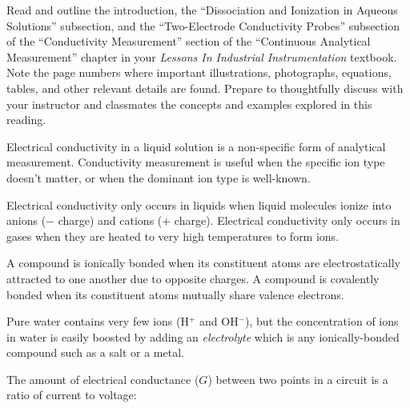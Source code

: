 
Read and outline the introduction, the ``Dissociation and Ionization in Aqueous Solutions'' subsection, and the ``Two-Electrode Conductivity Probes'' subsection of the ``Conductivity Measurement'' section of the ``Continuous Analytical Measurement'' chapter in your {\it Lessons In Industrial Instrumentation} textbook.  Note the page numbers where important illustrations, photographs, equations, tables, and other relevant details are found.  Prepare to thoughtfully discuss with your instructor and classmates the concepts and examples explored in this reading.













Electrical conductivity in a liquid solution is a non-specific form of analytical measurement.  Conductivity measurement is useful when the specific ion type doesn't matter, or when the dominant ion type is well-known.

\vskip 10pt

Electrical conductivity only occurs in liquids when liquid molecules ionize into anions ($-$ charge) and cations (+ charge).  Electrical conductivity only occurs in gases when they are heated to very high temperatures to form ions.

\vskip 10pt

A compound is ionically bonded when its constituent atoms are electrostatically attracted to one another due to opposite charges.  A compound is covalently bonded when its constituent atoms mutually share valence electrons.

\vskip 10pt

Pure water contains very few ions (H$^{+}$ and OH$^{-}$), but the concentration of ions in water is easily boosted by adding an {\it electrolyte} which is any ionically-bonded compound such as a salt or a metal.

\vskip 10pt

The amount of electrical conductance ($G$) between two points in a circuit is a ratio of current to voltage:

